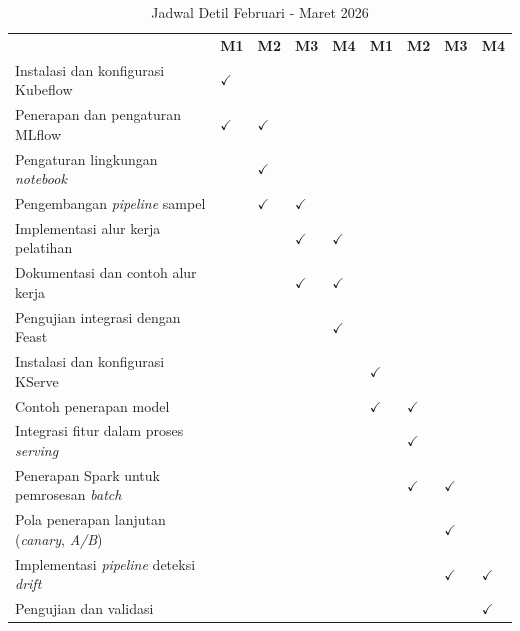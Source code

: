 \begin{table}[H]
\caption{Jadwal Detil Februari - Maret 2026}
\label{tab:schedule_feb_mar}
\footnotesize
\begin{tabular}{|>{\raggedright\arraybackslash}m{6cm}|>{\centering\arraybackslash}m{0.5cm}|>{\centering\arraybackslash}m{0.5cm}|>{\centering\arraybackslash}m{0.5cm}|>{\centering\arraybackslash}m{0.5cm}|>{\centering\arraybackslash}m{0.5cm}|>{\centering\arraybackslash}m{0.5cm}|>{\centering\arraybackslash}m{0.5cm}|>{\centering\arraybackslash}m{0.5cm}|}
\hline
\multirow{2}{6cm}{\centering\textbf{Kegiatan}} & \multicolumn{4}{c|}{\textbf{Februari 2026}} & \multicolumn{4}{c|}{\textbf{Maret 2026}} \\
\cline{2-9} & \textbf{M1} & \textbf{M2} & \textbf{M3} & \textbf{M4} & \textbf{M1} & \textbf{M2} & \textbf{M3} & \textbf{M4} \\
\hline
Instalasi dan konfigurasi Kubeflow & $\checkmark$ & & & & & & & \\
\hline
Penerapan dan pengaturan MLflow & $\checkmark$ & $\checkmark$ & & & & & & \\
\hline
Pengaturan lingkungan \textit{notebook} & & $\checkmark$ & & & & & & \\
\hline
Pengembangan \textit{pipeline} sampel & & $\checkmark$ & $\checkmark$ & & & & & \\
\hline
Implementasi alur kerja pelatihan & & & $\checkmark$ & $\checkmark$ & & & & \\
\hline
Dokumentasi dan contoh alur kerja & & & $\checkmark$ & $\checkmark$ & & & & \\
\hline
Pengujian integrasi dengan Feast & & & & $\checkmark$ & & & & \\
\hline
Instalasi dan konfigurasi KServe & & & & & $\checkmark$ & & & \\
\hline
Contoh penerapan model & & & & & $\checkmark$ & $\checkmark$ & & \\
\hline
Integrasi fitur dalam proses \textit{serving} & & & & & & $\checkmark$ & & \\
\hline
Penerapan Spark untuk pemrosesan \textit{batch} & & & & & & $\checkmark$ & $\checkmark$ & \\
\hline
Pola penerapan lanjutan (\textit{canary}, \textit{A/B}) & & & & & & & $\checkmark$ & \\
\hline
Implementasi \textit{pipeline} deteksi \textit{drift} & & & & & & & $\checkmark$ & $\checkmark$ \\
\hline
Pengujian dan validasi & & & & & & & & $\checkmark$ \\
\hline
\end{tabular}
\end{table}